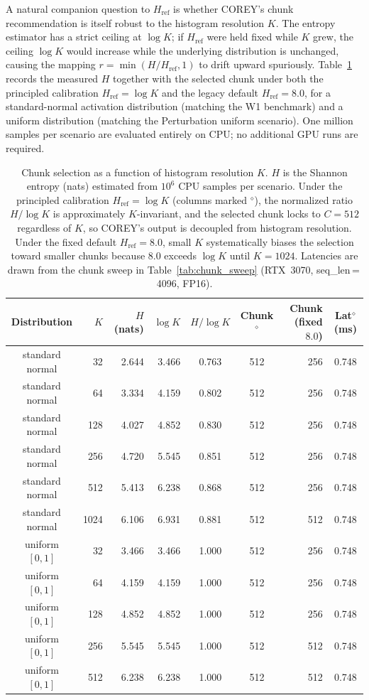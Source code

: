 A natural companion question to $H_{\text{ref}}$ is whether COREY's chunk recommendation is itself robust to the histogram resolution $K$. The entropy estimator has a strict ceiling at $\log K$; if $H_{\text{ref}}$ were held fixed while $K$ grew, the ceiling $\log K$ would increase while the underlying distribution is unchanged, causing the mapping $r{=}\min(H/H_{\text{ref}},1)$ to drift upward spuriously. Table~\ref{tab:bin_count_sensitivity} records the measured $H$ together with the selected chunk under both the principled calibration $H_{\text{ref}}{=}\log K$ and the legacy default $H_{\text{ref}}{=}8.0$, for a standard-normal activation distribution (matching the W1 benchmark) and a uniform distribution (matching the Perturbation uniform scenario). One million samples per scenario are evaluated entirely on CPU; no additional GPU runs are required.

\begin{table}[!t]
\centering
\caption{Chunk selection as a function of histogram resolution $K$. $H$ is the Shannon entropy (nats) estimated from $10^{6}$ CPU samples per scenario. Under the principled calibration $H_{\text{ref}}{=}\log K$ (columns marked $^\diamond$), the normalized ratio $H/\log K$ is approximately $K$-invariant, and the selected chunk locks to $C{=}512$ regardless of $K$, so COREY's output is decoupled from histogram resolution. Under the fixed default $H_{\text{ref}}{=}8.0$, small $K$ systematically biases the selection toward smaller chunks because $8.0$ exceeds $\log K$ until $K{=}1024$. Latencies are drawn from the chunk sweep in Table~\ref{tab:chunk_sweep} (RTX~3070, seq\_len\,=\,4096, FP16).}
\label{tab:bin_count_sensitivity}
\small
\begin{tabular}{crrrccrc}
\toprule
Distribution & $K$ & $H$ (nats) & $\log K$ & $H/\log K$ & Chunk$^{\diamond}$ & Chunk (fixed $8.0$) & Lat$^{\diamond}$ (ms) \\
\midrule
standard normal & 32   & 2.644 & 3.466 & 0.763 & 512 & 256 & 0.748 \\
standard normal & 64   & 3.334 & 4.159 & 0.802 & 512 & 256 & 0.748 \\
standard normal & 128  & 4.027 & 4.852 & 0.830 & 512 & 256 & 0.748 \\
standard normal & 256  & 4.720 & 5.545 & 0.851 & 512 & 256 & 0.748 \\
standard normal & 512  & 5.413 & 6.238 & 0.868 & 512 & 256 & 0.748 \\
standard normal & 1024 & 6.106 & 6.931 & 0.881 & 512 & 512 & 0.748 \\
\midrule
uniform $[0,1]$ & 32   & 3.466 & 3.466 & 1.000 & 512 & 256 & 0.748 \\
uniform $[0,1]$ & 64   & 4.159 & 4.159 & 1.000 & 512 & 256 & 0.748 \\
uniform $[0,1]$ & 128  & 4.852 & 4.852 & 1.000 & 512 & 256 & 0.748 \\
uniform $[0,1]$ & 256  & 5.545 & 5.545 & 1.000 & 512 & 512 & 0.748 \\
uniform $[0,1]$ & 512  & 6.238 & 6.238 & 1.000 & 512 & 512 & 0.748 \\
\bottomrule
\end{tabular}
\end{table}

